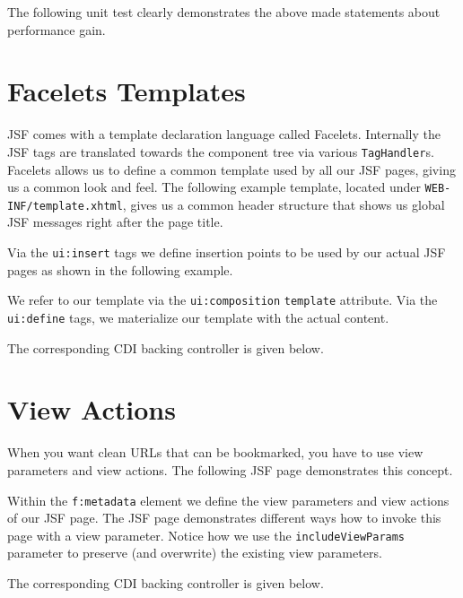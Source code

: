 The following unit test clearly demonstrates the above made statements about performance gain.



\section{Facelets Templates}
JSF comes with a template declaration language called Facelets.
Internally the JSF tags are translated towards the component tree via various \texttt{TagHandler}s.
Facelets allows us to define a common template used by all our JSF pages,
giving us a common look and feel.
The following example template, located under \texttt{WEB-INF/template.xhtml},
gives us a common header structure that shows us global JSF messages right after the page title.

Via the \texttt{ui:insert} tags we define insertion points to be used by our actual JSF pages as shown in the following example.

We refer to our template via the \texttt{ui:composition} \texttt{template} attribute.
Via the \texttt{ui:define} tags, we materialize our template with the actual content.

The corresponding CDI backing controller is given below.


\section{View Actions}
When you want clean URLs that can be bookmarked, you have to use view parameters and view actions.
The following JSF page demonstrates this concept.

Within the \texttt{f:metadata} element we define the view parameters and view actions of our JSF page.
The JSF page demonstrates different ways how to invoke this page with a view parameter.
Notice how we use the \texttt{includeViewParams} parameter to preserve (and overwrite) the existing view parameters.

The corresponding CDI backing controller is given below.


